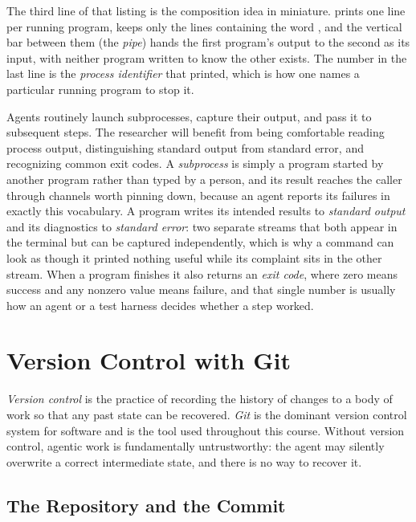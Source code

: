 The third line of that listing is the composition idea in miniature.
 prints one line per running program,  keeps only the lines containing the word , and the vertical bar between them (the \emph{pipe}) hands the first program's output to the second as its input, with neither program written to know the other exists.
The number  in the last line is the \emph{process identifier} that  printed, which is how one names a particular running program to stop it.

Agents routinely launch subprocesses, capture their output, and pass it to subsequent steps.
The researcher will benefit from being comfortable reading process output, distinguishing standard output from standard error, and recognizing common exit codes.
A \emph{subprocess} is simply a program started by another program rather than typed by a person, and its result reaches the caller through channels worth pinning down, because an agent reports its failures in exactly this vocabulary.
A program writes its intended results to \emph{standard output} and its diagnostics to \emph{standard error}: two separate streams that both appear in the terminal but can be captured independently, which is why a command can look as though it printed nothing useful while its complaint sits in the other stream.
When a program finishes it also returns an \emph{exit code}, where zero means success and any nonzero value means failure, and that single number is usually how an agent or a test harness decides whether a step worked.

\section{Version Control with Git}
\label{section:Git}

\emph{Version control} is the practice of recording the history of changes to a body of work so that any past state can be recovered.
\emph{Git} is the dominant version control system for software and is the tool used throughout this course.
Without version control, agentic work is fundamentally untrustworthy: the agent may silently overwrite a correct intermediate state, and there is no way to recover it.

\subsection{The Repository and the Commit}

